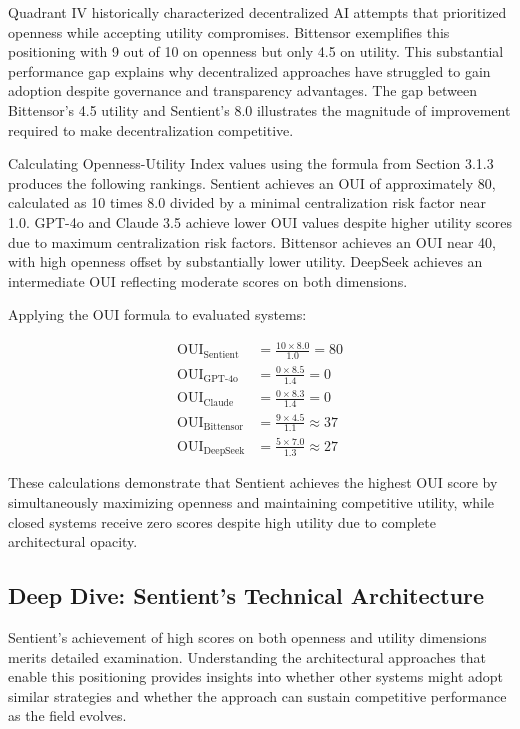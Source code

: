 Quadrant IV historically characterized decentralized AI attempts that prioritized openness while accepting utility compromises. Bittensor exemplifies this positioning with 9 out of 10 on openness but only 4.5 on utility. This substantial performance gap explains why decentralized approaches have struggled to gain adoption despite governance and transparency advantages. The gap between Bittensor's 4.5 utility and Sentient's 8.0 illustrates the magnitude of improvement required to make decentralization competitive.

Calculating Openness-Utility Index values using the formula from Section 3.1.3 produces the following rankings. Sentient achieves an OUI of approximately 80, calculated as 10 times 8.0 divided by a minimal centralization risk factor near 1.0. GPT-4o and Claude 3.5 achieve lower OUI values despite higher utility scores due to maximum centralization risk factors. Bittensor achieves an OUI near 40, with high openness offset by substantially lower utility. DeepSeek achieves an intermediate OUI reflecting moderate scores on both dimensions.

Applying the OUI formula to evaluated systems:

\begin{align}
\text{OUI}_{\text{Sentient}} &= \frac{10 \times 8.0}{1.0} = 80 \label{eq:oui_sentient}\\
\text{OUI}_{\text{GPT-4o}} &= \frac{0 \times 8.5}{1.4} = 0 \label{eq:oui_gpt4}\\
\text{OUI}_{\text{Claude}} &= \frac{0 \times 8.3}{1.4} = 0 \label{eq:oui_claude}\\
\text{OUI}_{\text{Bittensor}} &= \frac{9 \times 4.5}{1.1} \approx 37 \label{eq:oui_bittensor}\\
\text{OUI}_{\text{DeepSeek}} &= \frac{5 \times 7.0}{1.3} \approx 27 \label{eq:oui_deepseek}
\end{align}

These calculations demonstrate that Sentient achieves the highest OUI score by simultaneously maximizing openness and maintaining competitive utility, while closed systems receive zero scores despite high utility due to complete architectural opacity.

\subsection{Deep Dive: Sentient's Technical Architecture}

Sentient's achievement of high scores on both openness and utility dimensions merits detailed examination. Understanding the architectural approaches that enable this positioning provides insights into whether other systems might adopt similar strategies and whether the approach can sustain competitive performance as the field evolves.

